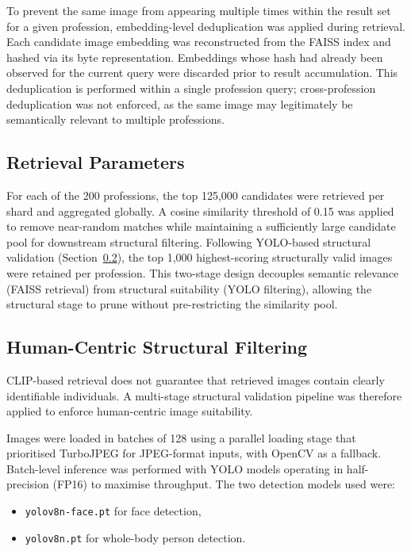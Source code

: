To prevent the same image from appearing multiple times within the result set for a given profession, embedding-level deduplication was applied during retrieval. Each candidate image embedding was reconstructed from the FAISS index and hashed via its byte representation. Embeddings whose hash had already been observed for the current query were discarded prior to result accumulation. This deduplication is performed within a single profession query; cross-profession deduplication was not enforced, as the same image may legitimately be semantically relevant to multiple professions.

\subsection{Retrieval Parameters}

For each of the 200 professions, the top 125{,}000 candidates were retrieved per shard and aggregated globally. A cosine similarity threshold of 0.15 was applied to remove near-random matches while maintaining a sufficiently large candidate pool for downstream structural filtering. Following YOLO-based structural validation (Section~\ref{subsec:yolo_filtering_retrieval}), the top 1{,}000 highest-scoring structurally valid images were retained per profession. This two-stage design decouples semantic relevance (FAISS retrieval) from structural suitability (YOLO filtering), allowing the structural stage to prune without pre-restricting the similarity pool.

\subsection{Human-Centric Structural Filtering}
\label{subsec:yolo_filtering_retrieval}

CLIP-based retrieval does not guarantee that retrieved images contain clearly identifiable individuals. A multi-stage structural validation pipeline was therefore applied to enforce human-centric image suitability.

Images were loaded in batches of 128 using a parallel loading stage that prioritised TurboJPEG for JPEG-format inputs, with OpenCV as a fallback. Batch-level inference was performed with YOLO models operating in half-precision (FP16) to maximise throughput. The two detection models used were:

\begin{itemize}
	\item \texttt{yolov8n-face.pt} for face detection,
	\item \texttt{yolov8n.pt} for whole-body person detection.
\end{itemize}

